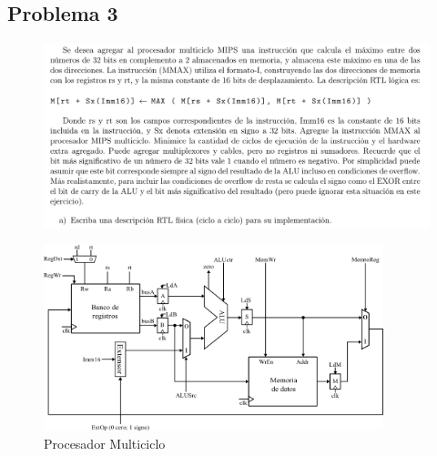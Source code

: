 \documentclass[letterpaper,11pt,notitlepage]{article}
\begin{document}
\subsection*{Problema 3}

\begin{figure}[H]
\begin{center}
\includegraphics[width=\textwidth]{3.png}
\end{center}
\end{figure}

\begin{figure}[H]
\begin{center}
\includegraphics[width=0.88\textwidth,keepaspectratio=true]{proc}
\end{center}
\caption{Procesador Multiciclo}
\end{figure}
\end{document}

